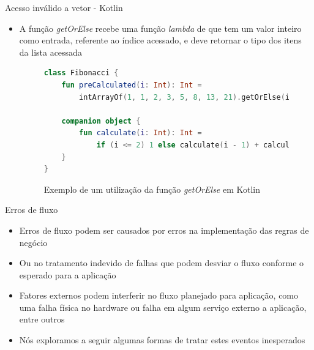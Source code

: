 \documentclass[brazilian]{beamer}
\begin{document}
\begin{frame}[fragile]{Acesso inválido a vetor - Kotlin}
    \begin{itemize}
        \item A função \emph{getOrElse} recebe uma função \textit{lambda} de que 
        tem um valor inteiro como entrada, referente ao índice acessado, e deve retornar o tipo dos itens da lista acessada
        \begin{figure}[H]
            \centering
            \begin{lstlisting}[language=Kotlin]
class Fibonacci {
    fun preCalculated(i: Int): Int = 
        intArrayOf(1, 1, 2, 3, 5, 8, 13, 21).getOrElse(i) { calculate(it) }

    companion object {
        fun calculate(i: Int): Int = 
            if (i <= 2) 1 else calculate(i - 1) + calculate(i - 2)
    }
}
            \end{lstlisting}
            \caption{Exemplo de um utilização da função \textit{getOrElse} em Kotlin}
            \label{fig:kotlin_get_or_else_array_access}
        \end{figure}
    \end{itemize}
\end{frame}

\begin{frame}{Erros de fluxo}
    \begin{itemize}
        \item Erros de fluxo podem ser causados por erros na implementação das regras de negócio
        \item Ou no tratamento indevido de falhas que podem desviar o fluxo conforme o esperado para a aplicação
        \item Fatores externos podem interferir no fluxo planejado para aplicação, como uma falha física no hardware ou falha em algum serviço externo a aplicação, entre outros
        \item Nós exploramos a seguir algumas formas de tratar estes eventos inesperados
    \end{itemize}
\end{frame}
\end{document}
